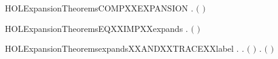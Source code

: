 \newcommand{\HOLExpansionDefinitionsEXPANSION}{\UseVerbatim{HOLExpansionDefinitionsEXPANSION}}
\newcommand{\HOLExpansionDefinitions}{
\HOLDfnTag{Expansion}{expands_def}\HOLExpansionDefinitionsexpandsXXdef
\HOLDfnTag{Expansion}{EXPANSION}\HOLExpansionDefinitionsEXPANSION
}
\begin{SaveVerbatim}{HOLExpansionTheoremsCOMPXXEXPANSION}
\HOLTokenTurnstile{} \HOLSymConst{\HOLTokenForall{}} .
         \HOLSymConst{\HOLTokenConj{}}   \HOLSymConst{\HOLTokenImp{}}  \ensuremath{(}  \ensuremath{)}
\end{SaveVerbatim}
\newcommand{\HOLExpansionTheoremsCOMPXXEXPANSION}{\UseVerbatim{HOLExpansionTheoremsCOMPXXEXPANSION}}
\begin{SaveVerbatim}{HOLExpansionTheoremsEQXXIMPXXexpands}
\HOLTokenTurnstile{} \HOLSymConst{\HOLTokenForall{}} . \ensuremath{(} \HOLSymConst{\ensuremath{=}} \ensuremath{)} \HOLSymConst{\HOLTokenImp{}}   
\end{SaveVerbatim}
\newcommand{\HOLExpansionTheoremsEQXXIMPXXexpands}{\UseVerbatim{HOLExpansionTheoremsEQXXIMPXXexpands}}
\begin{SaveVerbatim}{HOLExpansionTheoremsexpandsXXANDXXTRACEXXlabel}
\HOLTokenTurnstile{} \HOLSymConst{\HOLTokenForall{}} .
          \HOLSymConst{\HOLTokenImp{}}
       \HOLSymConst{\HOLTokenForall{}}  .
               \HOLSymConst{\HOLTokenConj{}}  \ensuremath{(} \ensuremath{)}  \HOLSymConst{\HOLTokenImp{}}
           \HOLSymConst{\HOLTokenExists{}} .
                   \HOLSymConst{\HOLTokenConj{}}    \HOLSymConst{\HOLTokenConj{}}
                 \HOLSymConst{\HOLTokenLeq{}}   \HOLSymConst{\HOLTokenConj{}}
                \ensuremath{(} \ensuremath{)} 
\end{SaveVerbatim}
